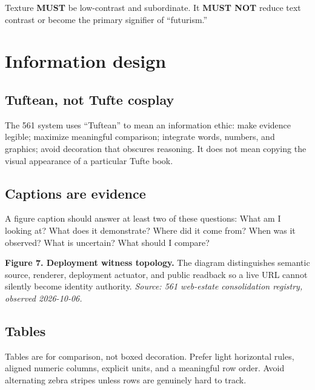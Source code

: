 \documentclass[11pt,twoside,openany]{report}
\newcommand{\MUST}{\textbf{MUST}\xspace}
\newcommand{\MUSTNOT}{\textbf{MUST NOT}\xspace}
\begin{document}
\begin{specbox}
Texture \MUST be low-contrast and subordinate. It \MUSTNOT reduce text contrast or become the primary signifier of ``futurism.''
\end{specbox}

\clearpage
\chapter{Information design}

\section{Tuftean, not Tufte cosplay}
The 561 system uses ``Tuftean'' to mean an information ethic: make evidence legible; maximize meaningful comparison; integrate words, numbers, and graphics; avoid decoration that obscures reasoning. It does not mean copying the visual appearance of a particular Tufte book.

\section{Captions are evidence}
A figure caption should answer at least two of these questions: What am I looking at? What does it demonstrate? Where did it come from? When was it observed? What is uncertain? What should I compare?

\begin{examplebox}[title={CAPTION ANATOMY}]
\textbf{Figure 7. Deployment witness topology.} The diagram distinguishes semantic source, renderer, deployment actuator, and public readback so a live URL cannot silently become identity authority. \textit{Source: 561 web-estate consolidation registry, observed 2026-10-06.}
\end{examplebox}

\section{Tables}
Tables are for comparison, not boxed decoration. Prefer light horizontal rules, aligned numeric columns, explicit units, and a meaningful row order. Avoid alternating zebra stripes unless rows are genuinely hard to track.
\end{document}
